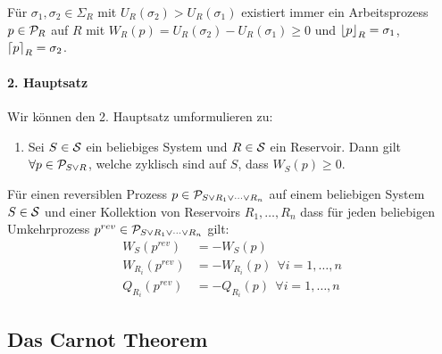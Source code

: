 \begin{bemerkung}
    Für $\sigma_1,\sigma_2 \in \Sigma_R$ mit $U_R (\sigma_2) > U_R (\sigma_1)$
    existiert immer ein Arbeitsprozess $p \in \P_R$ auf $R$ mit $W_R(p) =
    U_R (\sigma_2) - U_R (\sigma_1) \geq 0$ und $\floor{p}_R = \sigma_1$,
    $\ceil{p}_R = \sigma_2$.
\end{bemerkung}

\paragraph{2. Hauptsatz}
Wir können den 2. Hauptsatz umformulieren zu:
\begin{enumerate}[]
    \item Sei $S \in \S$ ein beliebiges System und $R \in \S$ ein Reservoir.
        Dann gilt $\forall p \in \P_{S \vee R}$, welche zyklisch sind auf $S$,
        dass $W_S(p) \geq 0$.
\end{enumerate}

\begin{bemerkung}
    Für einen reversiblen Prozess $p \in \P_{S \vee R_1 \vee \dotsb \vee R_n}$
    auf einem beliebigen System $S \in \S$ und einer Kollektion von Reservoirs
    $R_1,\dots,R_n$ dass für jeden beliebigen Umkehrprozess $p^{rev} \in
    \P_{S \vee R_1 \vee \dotsb \vee R_n}$ gilt:
    \begin{align*}
        W_S(p^{rev}) &= - W_S(p)
        \\
        W_{R_i} (p^{rev}) &= - W_{R_i}(p) \ \ \forall i = 1,\dots,n
        \\
        Q_{R_i} (p^{rev}) &= - Q_{R_i}(p) \ \ \forall i = 1,\dots,n
    \end{align*}
\end{bemerkung}


\subsection{Das Carnot Theorem}

